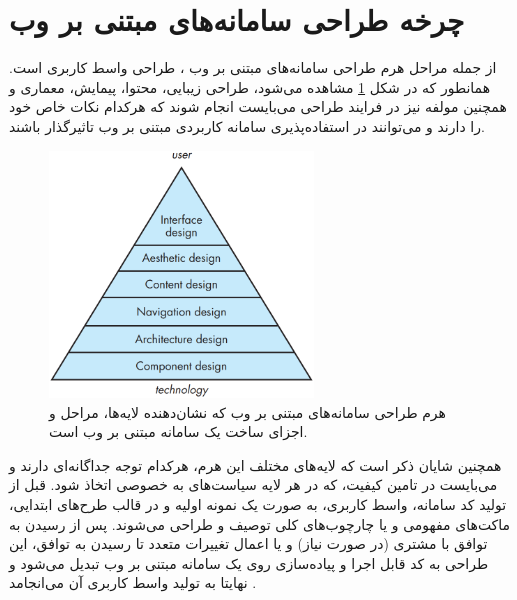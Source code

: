 \section{چرخه طراحی سامانه‌های مبتنی بر وب}
از جمله مراحل هرم طراحی سامانه‌های مبتنی بر وب
\cite{pressman_software_2015}،
طراحی واسط کاربری است.  همانطور که در شکل
\ref{fig:pyramid}
مشاهده می‌شود، طراحی زیبایی، محتوا، پیمایش، معماری و همچنین مولفه نیز در فرایند طراحی می‌بایست انجام شوند که هرکدام نکات خاص خود را دارند و می‌توانند در استفاده‌پذیری سامانه کاربردی مبتنی بر وب تاثیرگذار باشند.
\begin{figure}
	\centering\includegraphics[width=7cm]{Resources/pyramid.PNG}
	\caption[هرم طراحی سامانه‌های مبتنی بر وب]
	{هرم طراحی سامانه‌های مبتنی بر وب
		\cite{pressman_software_2015}
		که نشان‌دهنده لایه‌ها، مراحل و اجزای ساخت یک سامانه مبتنی بر وب است.
	}
	\label{fig:pyramid}
\end{figure}
همچنین شایان ذکر است که لایه‌های مختلف این هرم، هرکدام توجه جداگانه‌ای دارند و می‌بایست در تامین کیفیت، که در هر لایه سیاست‌های به خصوصی اتخاذ شود. قبل از تولید کد سامانه، واسط کاربری، به صورت یک نمونه اولیه و در قالب طرح‌های ابتدایی، ماکت‌های مفهومی و یا چارچوب‌های کلی توصیف و طراحی می‌شوند. پس از رسیدن به توافق با مشتری (در صورت نیاز) و یا اعمال تغییرات متعدد تا رسیدن به توافق، این طراحی به کد قابل اجرا و پیاده‌سازی روی یک سامانه مبتنی بر وب تبدیل می‌شود و نهایتا به تولید واسط کاربری آن می‌انجامد
\cite{sommerville_software_2016}.

